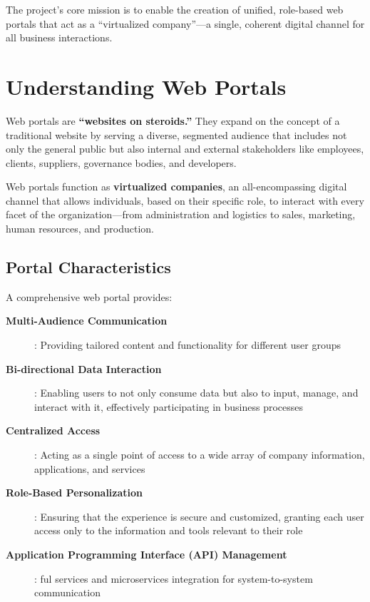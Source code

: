 The project's core mission is to enable the creation of unified, role-based web portals that act as a ``virtualized company''—a single, coherent digital channel for all business interactions.

\section{Understanding Web Portals}
\label{sec:web-portals}

Web portals are \textbf{``websites on steroids.''} They expand on the concept of a traditional website by serving a diverse, segmented audience that includes not only the general public but also internal and external stakeholders like employees, clients, suppliers, governance bodies, and developers.

Web portals function as \textbf{virtualized companies}, an all-encompassing digital channel that allows individuals, based on their specific role, to interact with every facet of the organization—from administration and logistics to sales, marketing, human resources, and production.

\subsection{Portal Characteristics}

A comprehensive web portal provides:

\begin{description}
\item[\textbf{Multi-Audience Communication}]: Providing tailored content and functionality for different user groups
\item[\textbf{Bi-directional Data Interaction}]: Enabling users to not only consume data but also to input, manage, and interact with it, effectively participating in business processes
\item[\textbf{Centralized Access}]: Acting as a single point of access to a wide array of company information, applications, and services
\item[\textbf{Role-Based Personalization}]: Ensuring that the experience is secure and customized, granting each user access only to the information and tools relevant to their role
\item[\textbf{Application Programming Interface (API) Management}]: \rest{}ful services and microservices integration for system-to-system communication
\end{description}

